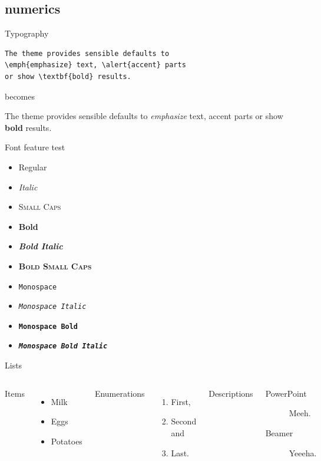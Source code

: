\documentclass[10pt,dvipsnames]{beamer}
\begin{document}
\subsection{numerics}



\begin{frame}[fragile]{Typography}
      \begin{verbatim}The theme provides sensible defaults to
\emph{emphasize} text, \alert{accent} parts
or show \textbf{bold} results.\end{verbatim}

  \begin{center}becomes\end{center}

  The theme provides sensible defaults to \emph{emphasize} text,
  \alert{accent} parts or show \textbf{bold} results.
\end{frame}

\begin{frame}{Font feature test}
  \begin{itemize}
    \item Regular
    \item \textit{Italic}
    \item \textsc{Small Caps}
    \item \textbf{Bold}
    \item \textbf{\textit{Bold Italic}}
    \item \textbf{\textsc{Bold Small Caps}}
    \item \texttt{Monospace}
    \item \texttt{\textit{Monospace Italic}}
    \item \texttt{\textbf{Monospace Bold}}
    \item \texttt{\textbf{\textit{Monospace Bold Italic}}}
  \end{itemize}
\end{frame}

\begin{frame}{Lists}
  \begin{columns}[T,onlytextwidth]
      Items
      \begin{itemize}
        \item Milk \item Eggs \item Potatoes
      \end{itemize}

      Enumerations
      \begin{enumerate}
        \item First, \item Second and \item Last.
      \end{enumerate}

      Descriptions
      \begin{description}
        \item[PowerPoint] Meeh. \item[Beamer] Yeeeha.
      \end{description}
  \end{columns}
\end{frame}
\end{document}
